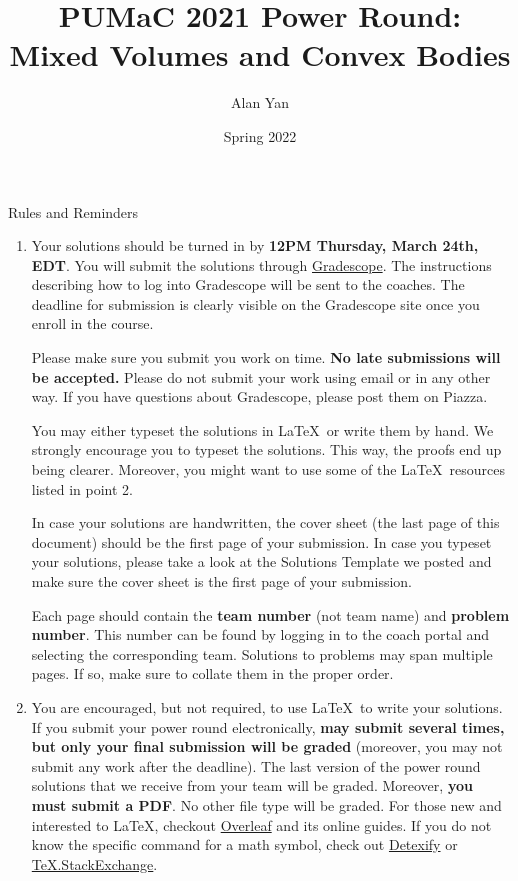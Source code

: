 \documentclass[11pt]{article}
\title{PUMaC 2021 Power Round: \\ Mixed Volumes and Convex Bodies}
\author{Alan Yan}
\date{Spring 2022}
\begin{document}
\pagestyle{plain}
\maketitle
{\LARGE{Rules and Reminders}}

\begin{enumerate}
\item Your solutions should be turned in by \textbf{12PM Thursday, March 24th, EDT}. You will submit the solutions through \href{https://www.gradescope.com/}{Gradescope}. The instructions describing how to log into Gradescope will be sent to the coaches. The deadline for submission is clearly visible on the Gradescope site once you enroll in the course. 

Please make sure you submit you work on time. \textbf{No late submissions will be accepted.} Please do not submit your work using email or in any other way. If you have questions about Gradescope, please post them on Piazza.

You may either typeset the solutions in \LaTeX\ or write them by hand. We strongly encourage you to typeset the solutions. This way, the proofs end up being clearer. Moreover, you might want to use some of the \LaTeX\ resources listed in point 2.

In case your solutions are handwritten, the cover sheet (the last page of this document) should be the first page of your submission. In case you typeset your solutions, please take a look at the Solutions Template we posted and make sure the cover sheet is the first page of your submission.

Each page should contain the \textbf{team number} (not team name) and \textbf{problem number}. This number can be found by logging in to the coach portal and selecting the corresponding team. Solutions to problems may span multiple pages. If so, make sure to collate them in the proper order. 

\item You are encouraged, but not required, to use \LaTeX\ to write your solutions. If you submit your power round electronically, \textbf{may submit several times, but only your final submission will be graded} (moreover, you may not submit any work after the deadline). The last version of the power round solutions that we receive from your team will be graded. Moreover, \textbf{you must submit a PDF}. No other file type will be graded. For those new and interested to \LaTeX, checkout \href{http://www.overleaf.com}{Overleaf} and its online guides. If you do not know the specific command for a math symbol, check out \href{https://detexify.kirelabs.org/classify.html}{Detexify} or \href{https://tex.stackexchange.com/}{TeX.StackExchange}. 


\end{enumerate}
\end{document}
